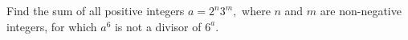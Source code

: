 Find the sum of all positive integers $a=2^{n}3^{m},$ where $n$ and $m$ are non-negative integers, for which $a^{6}$ is not a divisor of $6^{a}.$